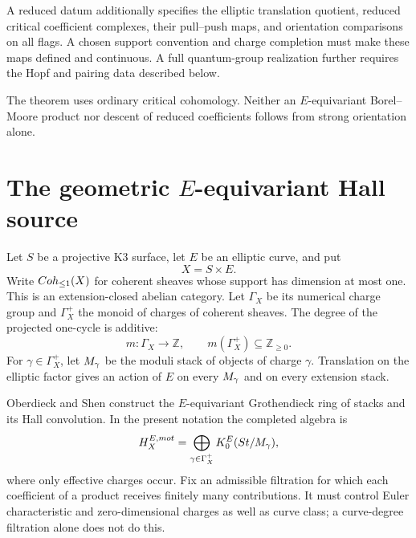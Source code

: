 \begin{definition}
A reduced datum additionally specifies the elliptic translation
quotient, reduced critical coefficient complexes, their pull--push maps,
and orientation comparisons on all flags. A chosen support convention
and charge completion must make these maps defined and continuous.
A full quantum-group realization further requires the Hopf and pairing
data described below.
\end{definition}

The theorem uses ordinary critical cohomology. Neither an
$E$-equivariant Borel--Moore product nor descent of reduced coefficients
follows from strong orientation alone.

\section{The geometric \texorpdfstring{$E$}{E}-equivariant Hall source}
Let $S$ be a projective K3 surface, let $E$ be an elliptic curve, and put
\[
 X=S\times E.
\]
Write $Coh_{\leq1}(X)$ for coherent sheaves whose support has dimension at most one.  This is an extension-closed abelian category.  Let $\Gamma_X$ be its numerical charge group and $\Gamma_X^+$ the
monoid of charges of coherent sheaves. The degree of the projected
one-cycle is additive:
\[
 m:\Gamma_X\longrightarrow\mathbb Z,\qquad
 m(\Gamma_X^+)\subseteq\mathbb Z_{\geq0}.
\]
For $\gamma\in\Gamma_X^+$, let $M_\gamma$ be the moduli stack of objects of charge $\gamma$.  Translation on the elliptic factor gives an action of $E$ on every $M_\gamma$ and on every extension stack.

Oberdieck and Shen construct the $E$-equivariant Grothendieck ring of stacks and its Hall convolution.  In the present notation the completed algebra is
\[
 H_X^{E,mot}
 =\bigoplus_{\gamma\in\Gamma_X^+}
 K_0^E(St/M_\gamma),
\]
where only effective charges occur. Fix an admissible filtration for
which each coefficient of a product receives finitely many contributions.
It must control Euler characteristic and zero-dimensional charges as
well as curve class; a curve-degree filtration alone does not do this.

